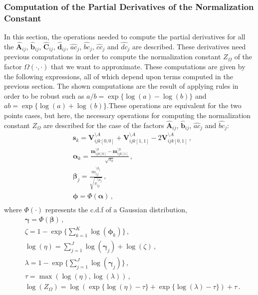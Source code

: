 \documentclass[review,preprint,12pt]{elsarticle}
\begin{document}
\subsubsection{Computation of the Partial Derivatives of the Normalization Constant}

In this section, the operations needed to compute the partial derivatives for all the $\hat{\boldsymbol{A}}_{ij}$, $\hat{\boldsymbol{b}}_{ij}$, $\hat{\boldsymbol{C}}_{ij}$, $\hat{\boldsymbol{d}}_{ij}$, $\hat{ac}_j$, $\hat{bc}_j$, $\hat{cc}_j$ and $\hat{dc}_j$ are described. These derivatives need previous computations in order to compute the normalization constant $Z_\Omega$ of the factor $\Omega(\cdot,\cdot)$ that we want to approximate. These computations are given by the following expressions, all of which depend upon terms computed in the previous section. The shown computations are the result of applying rules in order to be robust such as $a/b = \exp\{\log(a)-\log(b)\}$ and $ab = \exp\{\log(a)+\log(b)\}$.These operations are equivalent for the two points cases, but here, the necessary operations for computing the normalization constant $Z_\Omega$ are described for the case of the factors $\hat{\boldsymbol{A}}_{ij}$, $\hat{\boldsymbol{b}}_{ij}$, $\hat{ac}_j$ and $\hat{bc}_j$:
\begin{align}
    & \boldsymbol{s}_k = \boldsymbol{V}_{ijk[0,0]}^{\setminus A} + \boldsymbol{V}_{ijk[1,1]}^{\setminus A} - 2\boldsymbol{V}_{ijk[0,1]}^{\setminus A}\,, \\
    & \boldsymbol{\alpha}_k = \frac{\boldsymbol{m}_{ijk[0]}^{\setminus b}-\boldsymbol{m}_{ijk[1]}^{\setminus b}}{\sqrt{s_k}}\,, \\
    & \boldsymbol{\beta}_j = \frac{m_{ij}^{\setminus b_j}}{\sqrt{v_{ij}^{\setminus a_j}}}\,, \\
    & \boldsymbol{\phi} = \Phi(\boldsymbol{\alpha})\,, \\
\end{align}
where $\Phi(\cdot)$ represents the c.d.f of a Gaussian distribution,
\begin{align}
    & \boldsymbol{\gamma} = \Phi(\boldsymbol{\beta})\,, \\
    & \zeta = 1-\exp\{\sum_{k=1}^{K} \log(\boldsymbol{\phi}_k)\}\,, \\
    & \log(\eta) = \sum_{j=1}^{J}\log(\boldsymbol{\gamma}_j) + \log(\zeta)\,, \\
    & \lambda = 1-\exp\{\sum_{j=1}^{J}\log(\boldsymbol{\gamma}_j)\}\,, \\
    & \tau = \max(\log(\eta),\log(\lambda))\,, \\
    & \log(Z_\Omega) = \log(\exp\{\log(\eta) - \tau\} + \exp\{\log(\lambda) - \tau\}) + \tau\,.
\end{align}
\end{document}
